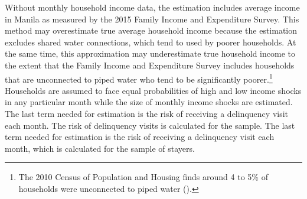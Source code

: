 \documentclass[12pt]{article}
\begin{document}
Without monthly household income data, the estimation includes average income in Manila as measured by the 2015 Family Income and Expenditure Survey.  This method may overestimate true average household income because the estimation excludes shared water connections, which tend to used by poorer households.  At the same time, this approximation may underestimate true household income to the extent that the Family Income and Expenditure Survey includes households that are unconnected to piped water who tend to be significantly poorer.\footnote{The 2010 Census of Population and Housing finds around 4 to 5\% of households were unconnected to piped water (\cite{wjv}).}  Households are assumed to face equal probabilities of high and low income shocks in any particular month while the size of monthly income shocks are estimated.  The last term needed for estimation is the risk of receiving a delinquency visit each month.  The risk of delinquency visits is calculated for the sample.  The last term needed for estimation is the risk of receiving a delinquency visit each month, which is calculated for the sample of stayers.

\begin{table}[H]
\centering
\caption{Calibrated and Assumed Parameters}\label{table:calibratedparam}
\vspace{-2mm}
\end{table}
\end{document}
